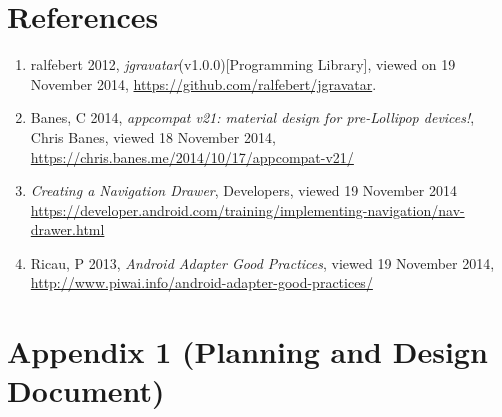 \documentclass[11pt,english,numbers=endperiod,parskip=half]{scrartcl}
\begin{document}
\section{References}
  \begin{enumerate}
    \item{
      ralfebert 2012, \textit{jgravatar}(v1.0.0)[Programming Library],
      viewed on 19 November 2014,
      \url{https://github.com/ralfebert/jgravatar}.
    }
    \item{
      Banes, C 2014, \textit{appcompat v21: material design for pre-Lollipop
      devices!}, Chris Banes, viewed 18 November 2014,
      \url{https://chris.banes.me/2014/10/17/appcompat-v21/}
    }
    \item{
      \textit{Creating a Navigation Drawer}, Developers, viewed 19 November 2014
      \url{https://developer.android.com/training/implementing-navigation/nav-drawer.html}
    }
    \item{
      Ricau, P 2013, \textit{Android Adapter Good Practices}, viewed 19 November
      2014, \url{http://www.piwai.info/android-adapter-good-practices/}
    }
  \end{enumerate}

\section{Appendix 1 (Planning and Design Document)}
  
\end{document}
